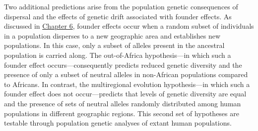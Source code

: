\documentclass[
]{book}
\begin{document}
Two additional predictions arise from the population genetic consequences of dispersal and the effects of genetic drift associated with founder effects. As discussed in \href{evolutionary-mechanisms-ii-mutation-genetic-drift-migration-and-non-random-mating.html\#genetic-drift-the-random-force}{Chapter 6}, founder effects occur when a random subset of individuals in a population disperses to a new geographic area and establishes new populations. In this case, only a subset of alleles present in the ancestral population is carried along. The out-of-Africa hypothesis---in which such a founder effect occurs---consequently predicts reduced genetic diversity and the presence of only a subset of neutral alleles in non-African populations compared to Africans. In contrast, the multiregional evolution hypothesis---in which such a founder effect does not occur---predicts that levels of genetic diversity are equal and the presence of sets of neutral alleles randomly distributed among human populations in different geographic regions. This second set of hypotheses are testable through population genetic analyses of extant human populations.
\end{document}
